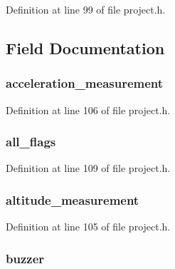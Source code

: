 \-Definition at line 99 of file project.\-h.



\subsection{\-Field \-Documentation}
\hypertarget{unions__request__flags_a8bfa9030e5a42a8c4745e82e25c0cd57}{
\subsubsection[{acceleration\-\_\-measurement}]{ {\bf acceleration\-\_\-measurement}}}\label{unions__request__flags_a8bfa9030e5a42a8c4745e82e25c0cd57}


\-Definition at line 106 of file project.\-h.

\hypertarget{unions__request__flags_abf876e68df8575f02084e137cc49266b}{
\subsubsection[{all\-\_\-flags}]{ {\bf all\-\_\-flags}}}\label{unions__request__flags_abf876e68df8575f02084e137cc49266b}


\-Definition at line 109 of file project.\-h.

\hypertarget{unions__request__flags_af1788224f8cde9b265d4426ec54989ed}{
\subsubsection[{altitude\-\_\-measurement}]{ {\bf altitude\-\_\-measurement}}}\label{unions__request__flags_af1788224f8cde9b265d4426ec54989ed}


\-Definition at line 105 of file project.\-h.

\hypertarget{unions__request__flags_a63ef67704ea037b7bd26848aa05a5fa4}{
\subsubsection[{buzzer}]{ {\bf buzzer}}}\label{unions__request__flags_a63ef67704ea037b7bd26848aa05a5fa4}


